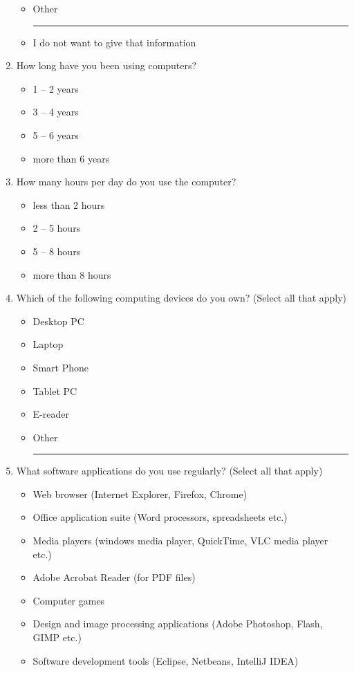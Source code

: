 \begin{enumerate}[topsep=-4em]
\begin{itemize}[topsep=-6em, label={o}]
\item Other \rule{4cm}{0.4pt}
\item I do not want to give that information
\end{itemize}
\item How long have you been using computers?
\begin{itemize}[topsep=-6em, label={o}]
\itemsep-1em 
\item 1 -- 2 years
\item 3 -- 4 years
\item 5 -- 6 years
\item more than 6 years
\end{itemize}
\item How many hours per day do you use the computer?
\begin{itemize}[topsep=-6em, label={o}]
\itemsep-1em 
\item less than 2 hours
\item 2 -- 5 hours
\item 5 -- 8 hours
\item more than 8 hours
\end{itemize}
\item Which of the following computing devices do you own? (Select all that apply)
\begin{itemize}[topsep=-6em, label={o}]
\itemsep-1em 
\item Desktop PC
\item Laptop
\item Smart Phone
\item Tablet PC
\item E-reader
\item Other \rule{4cm}{0.4pt}
\end{itemize}
\item What software applications do you use regularly? (Select all that apply)
\begin{itemize}[topsep=-6em, label={o}]
\itemsep-1em 
\item Web browser (Internet Explorer, Firefox, Chrome)
\item Office application suite (Word processors, spreadsheets etc.)
\item Media players (windows media player, QuickTime, VLC media player etc.)
\item Adobe Acrobat Reader (for PDF files)
\item Computer games
\item Design and image processing applications (Adobe Photoshop, Flash, GIMP etc.)
\item Software development tools (Eclipse, Netbeans, IntelliJ IDEA)

\end{itemize}
\end{enumerate}
